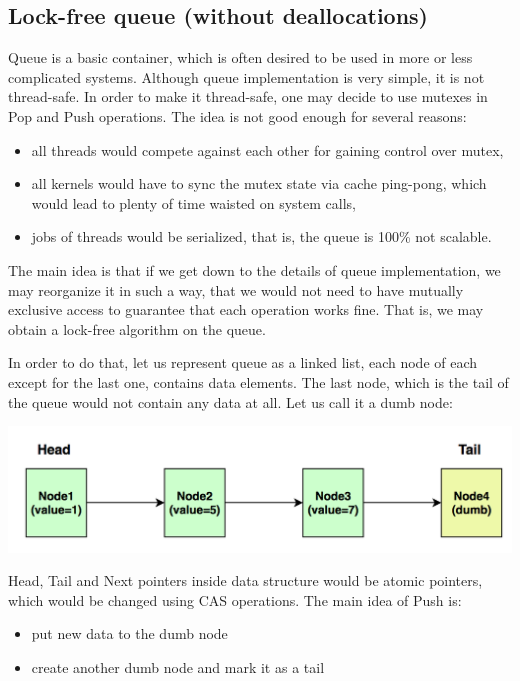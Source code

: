 \documentclass{article}
\begin{document}
\subsection{Lock-free queue (without deallocations)}
\label{subsec:lock_free_queue}

Queue is a basic container, which is often desired to be used in more or less complicated systems. Although queue implementation is very simple, it is not thread-safe. In order to make it thread-safe, one may decide to use mutexes in Pop and Push operations. The idea is not good enough for several reasons:
\begin{itemize}
	\item all threads would compete against each other for gaining control over mutex,
	\item all kernels would have to sync the mutex state via cache ping-pong, which would lead to plenty of time waisted on system calls,
	\item jobs of threads would be serialized, that is, the queue is 100\% not scalable.
\end{itemize}

The main idea is that if we get down to the details of queue implementation, we may reorganize it in such a way, that we would not need to have mutually exclusive access to guarantee that each operation works fine. That is, we may obtain a lock-free algorithm on the queue.

In order to do that, let us represent queue as a linked list, each node of each except for the last one, contains data elements. The last node, which is the tail of the queue would not contain any data at all. Let us call it a dumb node:

\begin{center}\includegraphics[width=0.5 \textwidth]{image4.png}\end{center}

Head, Tail and Next pointers inside data structure would be atomic pointers, which would be changed using CAS operations. The main idea of Push is:
\begin{itemize}
	\item put new data to the dumb node
	\item create another dumb node and mark it as a tail
\end{itemize}
\end{document}
